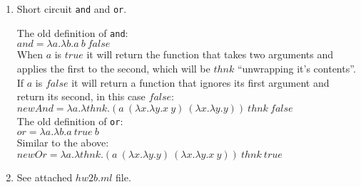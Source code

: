 \documentclass{article}
\begin{document}
\begin{description}
\begin{enumerate}
\begin{proof}
\begin{enumerate}
        \item E-Step:
            The last rule in derivation of $t\ \longrightarrow\ t$ can be 3 cases:
            \begin{enumerate}
            \item E-App1: Then we know $t$ is of form $(t1\ t2)$ and $t_1\ \longrightarrow\ t_1'$.
            \item E-App2: Then we know $t$ is of form $(v1\ t2)$ and $t_2\ \longrightarrow\ t_2'$.
            \item E-AppBeta: Then we know $t$ is of form $(t1\ v2)$.

            \verb|t|$_1$ must take a step to some \verb|t|$_1''$. By the inductive hypothesis, since we know \verb|t|$_1$ steps to both \verb|t|$_1'$ and \verb|t|$_1''$,
            then \verb|t|$_1'$ and \verb|t|$_1''$ must be the same.
            \end{enumerate}


        \item E-Trans: \verb|t|$_1$ must take a step to some \verb|t|$_1'$, and \verb|t| has the form
        \verb|if t|$_1$ \verb|then t|$_2$ \verb|else t|$_3$.


      \end{enumerate}
    \end{proof}

    \newpage

  \item Short circuit \verb|and| and \verb|or|.

    The old definition of \verb|and|:\\

    $and = \lambda a.\lambda b.a\ b\ false$\\

    When $a$ is $true$ it will return the function that takes two arguments and applies the first to the second, which will be $thnk$ ``unwrapping it's contents''. If $a$ is $false$ it will return a function that ignores its first argument and return its second, in this case $false$: \\

    $newAnd = \lambda a.\lambda thnk.(a\ (\lambda x.\lambda y.x\ y)\ (\lambda x.\lambda y.y))\ thnk\ false$\\

    The old definition of \verb|or|:\\

    $or = \lambda a.\lambda b.a\ true\ b$\\

    Similar to the above: \\

    $newOr = \lambda a.\lambda thnk.(a\ (\lambda x.\lambda y.y)\ (\lambda x.\lambda y.x\ y))\ thnk\ true$\\

  \item{See attached $hw2b.ml$ file.}
  \end{enumerate}

\end{description}
\end{document}

